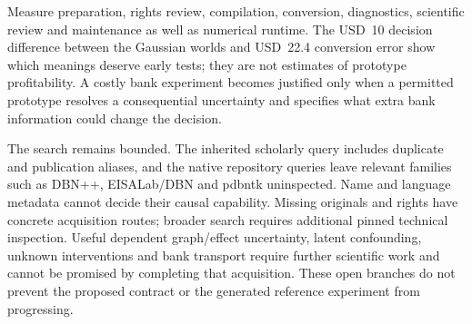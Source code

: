 Measure preparation, rights review, compilation, conversion, diagnostics,
scientific review and maintenance as well as numerical runtime. The USD~10
decision difference between the Gaussian worlds and USD~22.4 conversion error
show which meanings deserve early tests; they are not estimates of prototype
profitability. A costly bank experiment becomes justified only when a permitted
prototype resolves a consequential uncertainty and specifies what extra bank
information could change the decision. \citep{exec16_ct_oracle,exec16_ct_design}

The search remains bounded. The inherited scholarly query includes duplicate
and publication aliases, and the native repository queries leave relevant
families such as DBN++, EISALab/DBN and pdbntk uninspected. Name and language
metadata cannot decide their causal capability. Missing originals and rights
have concrete acquisition routes; broader search requires additional pinned
technical inspection. Useful dependent graph/effect uncertainty, latent
confounding, unknown interventions and bank transport require further
scientific work and cannot be promised by completing that acquisition.
These open branches do not prevent the proposed contract or the generated
reference experiment from progressing. \citep{exec16_ct_design}
\label{exec16:cxx-temporal-end}
